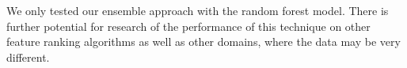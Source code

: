 \documentclass[fleqn,moreauthors,10pt]{ds_report}
\begin{document}
We only tested our ensemble approach with the random forest model. There is further potential for research of the performance of this technique on other feature ranking algorithms as well as other domains, where the data may be very different.
 

%
%
\end{document}
